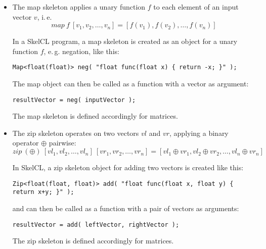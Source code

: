 \begin{itemize}
  \item The map skeleton applies a unary function $f$ to each element of an input vector $v$, i.\,e.
    \vspace{-.5em}
    \[ map\ f\ [v_1, v_2, \dots, v_n] = [f(v_1), f(v_2), \dots, f(v_n)] \]

    \vspace{-.5em}
    In a SkelCL program, a map skeleton is created as an object for a unary function $f$, e.\,g. negation, like this:

    \vspace{.5em}
    \centerline{\lstinline!Map<float(float)> neg( "float func(float x) { return -x; }" );!}
    \vspace{.5em}

    The map object can then be called as a function with a vector as argument:

    \vspace{.5em}
    \centerline{\lstinline!resultVector = neg( inputVector );!}
    \vspace{.5em}

    The map skeleton is defined accordingly for matrices.
    \vspace{.5em}
  \item The zip skeleton operates on two vectors $vl$ and $vr$, applying a binary operator $\oplus$ pairwise:
    \vspace{-.5em}
    \[ zip\ (\oplus)\ [vl_1, vl_2, \dots, vl_n]\ [vr_1, vr_2, \dots, vr_n] = [vl_1\oplus vr_1, vl_2\oplus vr_2, \dots, vl_n\oplus vr_n] \]

    \vspace{-.5em}
    In SkelCL, a zip skeleton object for adding two vectors is created like this:

    \vspace{.5em}
    \centerline{\lstinline!Zip<float(float, float)> add( "float func(float x, float y) { return x+y; }" );!}
    \vspace{.5em}

    and can then be called as a function with a pair of vectors as arguments:

    \vspace{.5em}
    \centerline{\lstinline!resultVector = add( leftVector, rightVector );!}
    \vspace{.5em}
    
    The zip skeleton is defined accordingly for matrices.
    \vspace{.5em}


\end{itemize}
